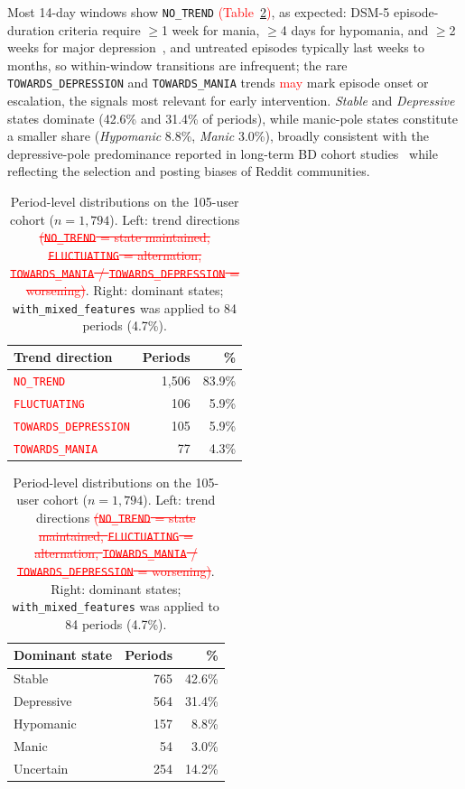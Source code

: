 \documentclass[runningheads]{llncs}
\newcommand{\rev}[1]{\textcolor{red}{#1}}
\newcommand{\del}[1]{\textcolor{red}{\sout{#1}}}
\newcommand{\rev}[1]{#1}
\newcommand{\del}[1]{}
\begin{document}
Most 14-day windows show \texttt{NO\_TREND} \rev{(Table~\ref{tab:pilot-dists})}, as expected: DSM-5 episode-duration criteria require $\geq$1 week for mania, $\geq$4 days for hypomania, and $\geq$2 weeks for major depression~\cite{apa2013dsm5}, and untreated episodes typically last weeks to months, so within-window transitions are infrequent; the rare \texttt{TOWARDS\_DEPRESSION} and \texttt{TOWARDS\_MANIA} trends \rev{may} mark episode onset or escalation, the signals most relevant for early intervention. \emph{Stable} and \emph{Depressive} states dominate (42.6\% and 31.4\% of periods), while manic-pole states constitute a smaller share (\emph{Hypomanic} 8.8\%, \emph{Manic} 3.0\%), broadly consistent with the depressive-pole predominance reported in long-term BD cohort studies~\cite{grande2016bipolar} while reflecting the selection and posting biases of Reddit communities.

\begin{table}[t]
\caption{Period-level distributions on the 105-user cohort ($n = 1{,}794$). Left: trend directions\del{ (\texttt{NO\_TREND} = state maintained, \texttt{FLUCTUATING} = alternation, \texttt{TOWARDS\_MANIA} / \texttt{TOWARDS\_DEPRESSION} = worsening)}. Right: dominant states; \texttt{with\_mixed\_features} was applied to 84 periods (4.7\%).}
\label{tab:pilot-dists}
\centering
\begin{tabular}{lrr}
\toprule
\textbf{Trend direction} & \textbf{Periods} & \textbf{\%} \\
\midrule
\rev{\texttt{NO\_TREND}} & 1,506 & 83.9\% \\
\rev{\texttt{FLUCTUATING}} & 106 & 5.9\% \\
\rev{\texttt{TOWARDS\_DEPRESSION}} & 105 & 5.9\% \\
\rev{\texttt{TOWARDS\_MANIA}} & 77 & 4.3\% \\
\bottomrule
\end{tabular}
\hspace{2em}
\begin{tabular}{lrr}
\toprule
\textbf{Dominant state} & \textbf{Periods} & \textbf{\%} \\
\midrule
Stable & 765 & 42.6\% \\
Depressive & 564 & 31.4\% \\
Hypomanic & 157 & 8.8\% \\
Manic & 54 & 3.0\% \\
Uncertain & 254 & 14.2\% \\
\bottomrule
\end{tabular}
\end{table}
\end{document}
